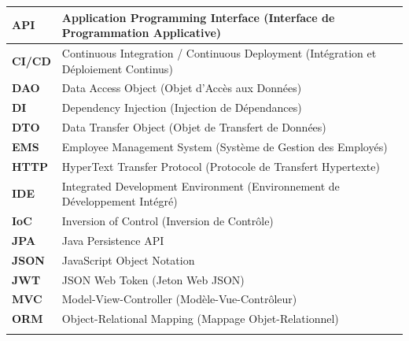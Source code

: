 \documentclass[12pt, a4paper, openany]{report}
\begin{document}
\begin{center}
\begin{tabular}{|>{\centering\arraybackslash}p{}|>{\raggedright\arraybackslash}p{}|}
    \rowcolor{lightBlue}
    \textbf{API} & Application Programming Interface (Interface de Programmation Applicative) \\
    \hline
    \textbf{CI/CD} & Continuous Integration / Continuous Deployment (Intégration et Déploiement Continus) \\
    \hline
    \rowcolor{lightBlue}
    \textbf{DAO} & Data Access Object (Objet d'Accès aux Données) \\
    \hline
    \textbf{DI} & Dependency Injection (Injection de Dépendances) \\
    \hline
    \rowcolor{lightBlue}
    \textbf{DTO} & Data Transfer Object (Objet de Transfert de Données) \\
    \hline
    \textbf{EMS} & Employee Management System (Système de Gestion des Employés) \\
    \hline
    \rowcolor{lightBlue}
    \textbf{HTTP} & HyperText Transfer Protocol (Protocole de Transfert Hypertexte) \\
    \hline
    \textbf{IDE} & Integrated Development Environment (Environnement de Développement Intégré) \\
    \hline
    \rowcolor{lightBlue}
    \textbf{IoC} & Inversion of Control (Inversion de Contrôle) \\
    \hline
    \textbf{JPA} & Java Persistence API \\
    \hline
    \rowcolor{lightBlue}
    \textbf{JSON} & JavaScript Object Notation \\
    \hline
    \textbf{JWT} & JSON Web Token (Jeton Web JSON) \\
    \hline
    \rowcolor{lightBlue}
    \textbf{MVC} & Model-View-Controller (Modèle-Vue-Contrôleur) \\
    \hline
    \textbf{ORM} & Object-Relational Mapping (Mappage Objet-Relationnel) \\
    \hline
    \rowcolor{lightBlue}

\end{tabular}
\end{center}
\end{document}
